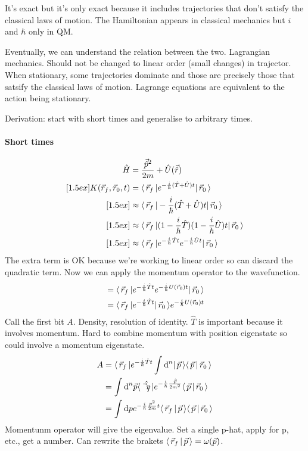 \documentclass[a4paper]{extarticle}
\newcommand{\ihbar}{\frac{i}{\hbar}}
\newcommand{\propagator}{K(\vec{r}_f, \vec{r}_0, t)}
\begin{document}
It's exact but it's only exact because it includes trajectories that don't
satisfy the classical laws of motion.
The Hamiltonian appears in classical mechanics but $i$ and $\hbar$ only in QM.

Eventually, we can understand the relation between the two.
Lagrangian mechanics.
Should not be changed to linear order (small changes) in trajector.
When stationary, some trajectories dominate and those are precisely those that
satsify the classical laws of motion.
Lagrange equations are equivalent to the action being stationary.

Derivation: start with short times and generalise to arbitrary times.

\paragraph{Short times}

\begin{align}
  \hat{H}
   & = \frac{\vec{\hat{p}}^2}{2m} + \hat{U}(\vec{\hat{r}})
  \\
  [1.5ex]
  \propagator
   & = \bra{\vec{r}_f} e^{-\ihbar (\hat{T} + \hat{U}) t} \ket{\vec{r}_0}
  \\
  [1.5ex]
   & \approx \bra{\vec{r}_f} -\ihbar (\hat{T} + \hat{U}) t \ket{\vec{r}_0}
  \\
  [1.5ex]
   & \approx \bra{\vec{r}_f} (1 - \ihbar\hat{T})(1 - \ihbar\hat{U}) t \ket{\vec{r}_0}
  \\
  [1.5ex]
   & \approx \bra{\vec{r}_f} e^{-\ihbar\hat{T}t} e^{-\ihbar\hat{U}t} \ket{\vec{r}_0}
\end{align}
The extra term is OK because we're working to linear order so can discard the
quadratic term.
Now we can apply the momentum operator to the wavefunction.
\begin{align}
   & = \bra{\vec{r}_f} e^{-\ihbar\hat{T}t} e^{-\ihbar U(\vec{r}_0) t} \ket{\vec{r}_0}
  \\
   & = \bra{\vec{r}_f} e^{-\ihbar\hat{T}t} \ket{\vec{r}_0} e^{-\ihbar U(\vec{r}_0) t}
\end{align}
Call the first bit $A$.
Density, resolution of identity.
$\hat{T}$ is important because it involves momentum.
Hard to combine momentum with position eigenstate so could involve a momentum
eigenstate.
\begin{align}
  A & = \bra{\vec{r}_f} e^{-\ihbar\hat{T}t} \int \text{d}^n \ket{\vec{p}}
  \braket{\vec{p}}{\vec{r}_0}
  \\
    & = \int \text{d}^n\vec{p} \bra{\hat{\vec{r}_f}}
  e^{-\ihbar\frac{\hat{\vec{p}}}{2m^2}} \braket{\vec{p}}{\vec{r}_0}
  \\
    & = \int
  \text{d}p e^{-\ihbar\frac{p^2}{2m}t} \braket{\vec{r}_f}{\vec{p}}
  \braket{\vec{p}}{\vec{r}_0}
\end{align}
Momentunm operator will give the
eigenvalue.
Set a single p-hat, apply for p, etc., get a number.
Can rewrite the brakets $\langle\,\vec{r}_f\,\vert\,\vec{p}\,\rangle = \omega(\vec{p})$.
\end{document}
